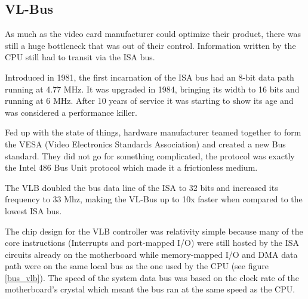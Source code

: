 \subsection{VL-Bus}
As much as the video card manufacturer could optimize their product, there was still a huge bottleneck that was out of their control. Information written by the CPU still had to transit via the ISA bus.\\
\par
 Introduced in 1981, the first incarnation of the ISA bus had an 8-bit data path running at 4.77 MHz. It was upgraded in 1984, bringing its width to 16 bits and running at 6 MHz. After 10 years of service it was starting to show its age and was considered a performance killer.\\
\par
{}
\par
Fed up with the state of things, hardware manufacturer teamed together to form the VESA (Video Electronics Standards Association) and created a new Bus standard. They did not go for something complicated, the protocol was exactly the Intel 486 Bus Unit protocol which made it a frictionless medium.\\
\par 
The VLB doubled the bus data line of the ISA to 32 bits and increased its frequency to 33 Mhz, making the VL-Bus up to 10x faster when compared to the lowest ISA bus.\\
\par
The chip design for the VLB controller was relativity simple because many of the core instructions (Interrupts and port-mapped I/O) were still hosted by the ISA circuits already on the motherboard while memory-mapped I/O and DMA data path were on the same local bus as the one used by the CPU (see figure \ref{bus_vlb}). The speed of the system data bus was based on the clock rate of the motherboard's crystal which meant the bus ran at the same speed as the CPU.\\
\par
{}
\label{vlbarchitecture}

